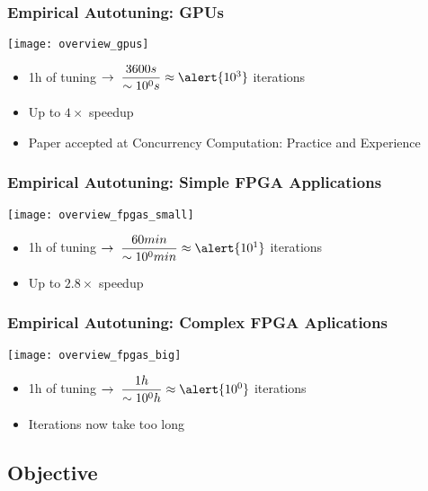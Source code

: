 \documentclass[10pt, compress, aspectratio=169]{beamer}
\begin{document}
\begin{frame}
    \frametitle{Empirical Autotuning: GPUs}
    \begin{center}
        \texttt{[image: overview\_gpus]}
    \end{center}

    \begin{itemize}
        \item \alert{1h} of tuning $\rightarrow \; \dfrac{3600s}{\sim{}10^0s} \approx \alert{10^3}$ \alert{iterations}
        \item Up to \alert{$4\times$ speedup}
        \item Paper accepted at Concurrency Computation: Practice and Experience
    \end{itemize}

    \vfill
\end{frame}

\begin{frame}
    \frametitle{Empirical Autotuning: Simple FPGA Applications}
    \begin{center}
        \texttt{[image: overview\_fpgas\_small]}
    \end{center}

    \begin{itemize}
        \item \alert{1h} of tuning $\rightarrow \; \dfrac{60min}{\sim{}10^0min} \approx \alert{10^1}$ \alert{iterations}
        \item Up to \alert{$2.8\times$ speedup}
    \end{itemize}
\end{frame}

\begin{frame}
    \frametitle{Empirical Autotuning: Complex FPGA Aplications}
    \begin{center}
        \texttt{[image: overview\_fpgas\_big]}
    \end{center}

    \begin{itemize}
        \item \alert{1h} of tuning $\rightarrow \; \dfrac{1h}{\sim{}10^0h} \approx \alert{10^0}$ \alert{iterations}
        \item Iterations now \alert{take too long}
    \end{itemize}
\end{frame}

\subsection{Objective}
\end{document}
